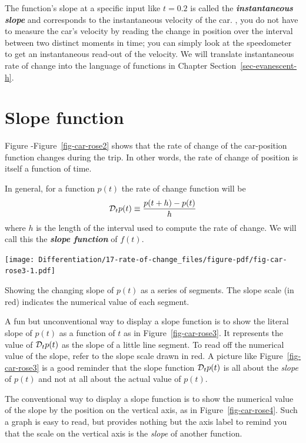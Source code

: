 \documentclass[
  letterpaper,
  DIV=11,
  numbers=noendperiod,
  oneside]{scrreprt}
\begin{document}
The function's slope at a specific input like \(t=0.2\) is called the
\textbf{\emph{instantaneous slope}} and corresponds to the instantaneous
velocity of the car. , you do not have to measure the car's velocity by
reading the change in position over the interval between two distinct
moments in time; you can simply look at the speedometer to get an
instantaneous read-out of the velocity. We will translate instantaneous
rate of change into the language of functions in Chapter
Section~\ref{sec-evanescent-h}.

\hypertarget{sec-slope-function}{%
\section{Slope function}\label{sec-slope-function}}

Figure -Figure~\ref{fig-car-rose2} shows that the rate of change of the
car-position function changes during the trip. In other words, the rate
of change of position is itself a function of time.

In general, for a function \(p(t)\) the rate of change function will be
\[{\cal D}_t p(t) \equiv \frac{p(t+h) - p(t)}{h}\] where \(h\) is the
length of the interval used to compute the rate of change. We will call
this the \textbf{\emph{slope function}} of \(f(t)\).

\begin{marginfigure}

{\centering \texttt{[image: Differentiation/17-rate-of-change\_files/figure-pdf/fig-car-rose3-1.pdf]}

}

\caption{\label{fig-car-rose3}Showing the changing slope of \(p(t)\) as
a series of segments. The slope scale (in red) indicates the numerical
value of each segment.}

\end{marginfigure}

A fun but unconventional way to display a slope function is to show the
literal slope of \(p(t)\) as a function of \(t\) as in
Figure~\ref{fig-car-rose3}. It represents the value of
\({\cal D}_t p(t)\) as the slope of a little line segment. To read off
the numerical value of the slope, refer to the slope scale drawn in red.
A picture like Figure~\ref{fig-car-rose3} is a good reminder that the
slope function \({\cal D}_t p(t)\) is all about the \emph{slope} of
\(p(t)\) and not at all about the actual value of \(p(t)\).

The conventional way to display a slope function is to show the
numerical value of the slope by the position on the vertical axis, as in
Figure~\ref{fig-car-rose4}. Such a graph is easy to read, but provides
nothing but the axis label to remind you that the scale on the vertical
axis is the \emph{slope} of another function.
\end{document}
